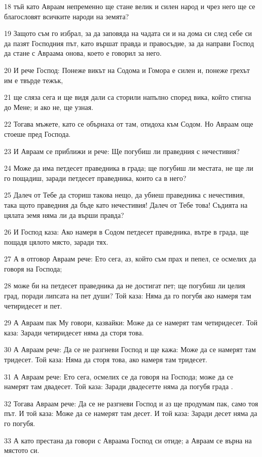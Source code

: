 \par 18 тъй като Авраам непременно ще стане велик и силен народ и чрез него ще се благословят всичките народи на земята?
\par 19 Защото съм го избрал, за да заповяда на чадата си и на дома си след себе си да пазят Господния път, като вършат правда и правосъдие, за да направи Господ да стане с Авраама онова, което е говорил за него.
\par 20 И рече Господ: Понеже викът на Содома и Гомора е силен и, понеже грехът им е твърде тежък,
\par 21 ще сляза сега и ще видя дали са сторили напълно според вика, който стигна до Мене; и ако не, ще узная.
\par 22 Тогава мъжете, като се обърнаха от там, отидоха към Содом. Но Авраам още стоеше пред Господа.
\par 23 И Авраам се приближи и рече: Ще погубиш ли праведния с нечестивия?
\par 24 Може да има петдесет праведника в града; ще погубиш ли местата, не ще ли го пощадиш, заради петдесет праведника, които са в него?
\par 25 Далеч от Тебе да сториш такова нещо, да убиеш праведника с нечестивия, така щото праведния да бъде като нечестивия! Далеч от Тебе това! Съдията на цялата земя няма ли да върши правда?
\par 26 И Господ каза: Ако намеря в Содом петдесет праведника, вътре в града, ще пощадя цялото място, заради тях.
\par 27 А в отговор Авраам рече: Ето сега, аз, който съм прах и пепел, се осмелих да говоря на Господа;
\par 28 може би на петдесет праведника да не достигат пет; ще погубиш ли целия град, поради липсата на пет души? Той каза: Няма да го погубя ако намеря там четиридесет и пет.
\par 29 А Авраам пак Му говори, казвайки: Може да се намерят там четиридесет. Той каза: Заради четиридесет няма да сторя това.
\par 30 А Авраам рече: Да се не разгневи Господ и ще кажа: Може да се намерят там тридесет. Той каза: Няма да сторя това, ако намеря там тридесет.
\par 31 А Авраам рече: Ето сега, осмелих се да говоря на Господа; може да се намерят там двадесет. Той каза: Заради двадесетте няма да погубя града .
\par 32 Тогава Авраам рече: Да се не разгневи Господ и аз ще продумам пак, само тоя път. И той каза: Може да се намерят там десет. И той каза: Заради десет няма да го погубя.
\par 33 А като престана да говори с Авраама Господ си отиде; а Авраам се върна на мястото си.

